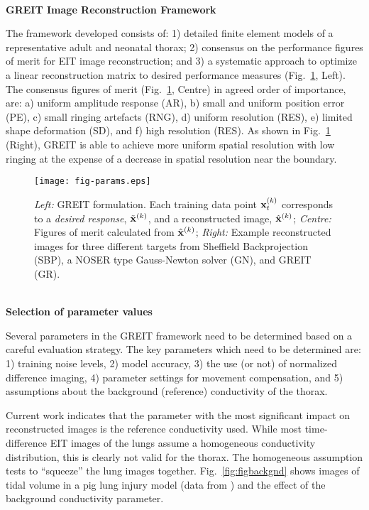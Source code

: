 \documentclass[12pt]{article}
\newcommand{\mysection}[1]{
~\\ \noindent
{\bf \normalsize #1}
\vspace{1mm}
}
\begin{document}
\vspace{-3mm}
\mysection{GREIT Image Reconstruction Framework}

The framework developed\cite{GREIT09} consists of: 1)
detailed finite element models of a representative adult
and neonatal thorax; 2) consensus on the performance
figures of merit for EIT image reconstruction; and 3) a
systematic approach to optimize a linear reconstruction
matrix to desired performance measures (Fig.\ \ref{fig:figparams}, Left).
The consensus figures of merit (Fig.\ \ref{fig:figparams}, Centre)
 in agreed order of importance,
are: a) uniform amplitude response (AR), b) small and
uniform position error (PE), c) small ringing artefacts (RNG),
d) uniform resolution (RES), e) limited shape deformation (SD),
and f) high resolution (RES). 
As shown in Fig.\ \ref{fig:figparams} (Right), GREIT is able to 
achieve more uniform spatial resolution with low ringing at the
expense of a decrease in spatial resolution near the boundary.
\vspace{-4mm}
\begin{figure}[htp]
\centering
\texttt{[image: fig-params.eps]}
\vspace{-6mm}
\caption{%
\small
{\em Left:} GREIT formulation. Each training data point
    ${\bf x}_t^{(k)}$ corresponds to a {\em desired response},
$\tilde{\bf x}^{(k)}$, and a reconstructed image,
  $\hat{\bf x}^{(k)}$;
{\em Centre:} Figures of merit calculated from $\hat{\bf x}^{(k)}$;
{\em Right:} Example reconstructed images for three different
targets from
Sheffield Backprojection (SBP), a NOSER type Gauss-Newton solver (GN),
and GREIT (GR).
}
\label{fig:figparams}
\end{figure}

\vspace{-8mm}
\mysection{Selection of parameter values}

Several parameters in the GREIT framework need to be
determined based on a careful evaluation strategy.
The key parameters which need to
be determined are:
1) training noise levels,
2) model accuracy,
3) the use (or not) of normalized difference imaging,
4) parameter settings for movement compensation, and
5) assumptions about the background (reference)
   conductivity of the thorax.

Current work indicates that the parameter with the most
significant impact on reconstructed images is the
reference conductivity used. While most time-difference EIT
images of the lungs assume a homogeneous conductivity 
distribution, this is clearly not valid for the thorax. 
The homogeneous assumption tests to ``squeeze'' the lung
images together. Fig.\ \ref{fig:figbackgnd} shows images
of tidal volume in a pig lung injury model (data from 
\cite{frerichs03}) and the effect of the background
conductivity parameter. 
\end{document}
